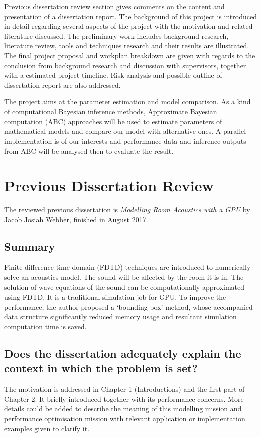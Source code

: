 \documentclass{article}
\begin{document}
Previous dissertation review section gives comments on the content 
and presentation of a dissertation report. The background of this project is 
introduced in detail regarding several aspects of the project with the motivation
and related literature discussed. 
The preliminary work includes background 
research, literature review, tools and techniques research and their results 
are illustrated. The final project 
proposal and workplan breakdown are given with regards to the conclusion from 
background research and discussion with supervisors, together with a 
estimated project timeline. Risk analysis and possible 
outline of dissertation report are also addressed.

The project aims at the parameter estimation and model comparison. As a kind of 
computational Bayesian inference methods, Approximate 
Bayesian computation (ABC) approaches will be used to estimate parameters of mathematical models and
compare our model with alternative ones. A parallel implementation is of our interests 
and performance data and inference outputs from ABC will be analysed then to evaluate the result.


\section{Previous Dissertation Review}

The reviewed previous dissertation is {\em Modelling Room Acoustics with a 
GPU} by Jacob Josiah Webber, finished in August 2017.
\subsection*{Summary}

Finite-difference time-domain (FDTD) techniques are introduced to numerically solve an acoustics model. The sound will be affected by the room it is in. The solution of wave equations of the sound can be computationally approximated using FDTD. It is a traditional simulation job for GPU. To improve the performance, the author proposed a ‘bounding box’ method, whose accompanied data structure significantly reduced memory usage and resultant simulation computation time is saved.

\subsection*{Does the dissertation adequately explain the context in which the problem is set?}

The motivation is addressed in Chapter 1 (Introductions) and the first part of Chapter 2. It briefly introduced together with its performance concerns. More details could be added to describe the meaning of this modelling mission and performance optimisation mission with relevant application or implementation examples given to clarify it.
\end{document}
